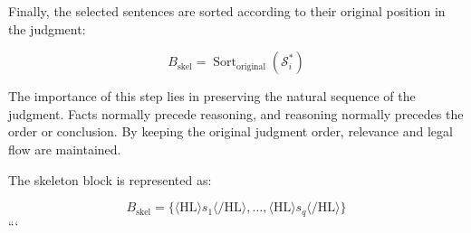 Finally, the selected sentences are sorted according to their original position in the judgment:

\begin{equation}
B_{\text{skel}}=\operatorname{Sort}_{\text{original}}(\mathcal{S}_i^{*})
\end{equation}

The importance of this step lies in preserving the natural sequence of the judgment. Facts normally precede reasoning, and reasoning normally precedes the order or conclusion. By keeping the original judgment order, relevance and legal flow are maintained.

The skeleton block is represented as:

\begin{equation}
B_{\text{skel}} =
\{
\langle \mathrm{HL} \rangle s_1 \langle /\mathrm{HL} \rangle,
\ldots,
\langle \mathrm{HL} \rangle s_q \langle /\mathrm{HL} \rangle
\}
\end{equation}
```
